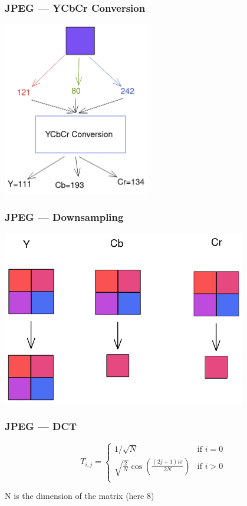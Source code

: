 \documentclass{beamer}
\begin{document}
\begin{frame}
    \frametitle{JPEG — YCbCr Conversion \cite{jpeg}}
    \begin{center}
        \includegraphics[width=0.48\textwidth]{ycbcr.png}
    \end{center}
\end{frame}

\begin{frame}
    \frametitle{JPEG — Downsampling}
    \begin{center}
        \includegraphics[width=0.8\textwidth]{downsampling.png}
    \end{center}
\end{frame}

\begin{frame}
    \frametitle{JPEG — DCT \cite{ken1998image}}
    $$
        T_{i,j}=\begin{cases}
            1/\sqrt{N}                                    & \text{if } i=0 \\
            \sqrt{\frac{2}{N}}\cos(\frac{(2j+1)i\pi}{2N}) & \text{if } i>0 \\
        \end{cases}
    $$

    N is the dimension of the matrix (here 8)
\end{frame}
\end{document}
